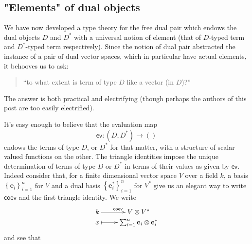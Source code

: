 \documentclass[pra,floatfix,
amsmath,superscriptaddress, 12pt]{article}
\theoremstyle{definition}
\newcommand{\evmap}{\mathsf{ev}}
\newcommand{\coev}{\mathsf{coev}}
\begin{document}
\subsection{"Elements" of dual objects}
We have now developed a type theory for the free dual pair which endows
the dual objects $D$ and $D^{*}$ with a universal notion of element (that of $D$-typed term and $D^*$-typed term respectively).
Since the notion of dual pair abstracted the instance of a pair of
dual vector spaces, which in particular have actual elements, it behooves
us to ask:
\begin{quotation}
``to what extent is term of type $D$ like a vector (in $D$)?''
\end{quotation}
The answer is both practical and electrifying (though perhaps the
authors of this post are too easily electrified).

It's easy enough to believe that the evaluation map 
\[
\evmap:\left(D,D^{*}\right)\longrightarrow\left(\right)
\]
 endows the terms of type $D$, or $D^{*}$ for that matter, with a
structure of scalar valued functions on the other. The triangle identities impose the unique determination of terms of type $D$ or $D^*$ in terms of their values as given by $\evmap$.  Indeed consider that, for a finite dimensional vector space $V$ over a field
$k$, a basis $\left\{ \mathbf{e}_{i}\right\} _{i=1}^{n}$ for $V$
and a dual basis $\left\{ \mathbf{e}_{i}^{*}\right\} _{i=1}^{n}$
for $V^{*}$ give us an elegant way to write $\coev$ and the
first triangle identity. We write
\[
\xymatrixrowsep{0pc}\xymatrix{k\ar[r]^{\coev} & V\otimes V^{*}\\
x\ar@{|->}[r] & \sum_{i=1}^{n}\mathbf{e}_{i}\otimes\mathbf{e}_{i}^{*}
}
\]
and see that
\end{document}
